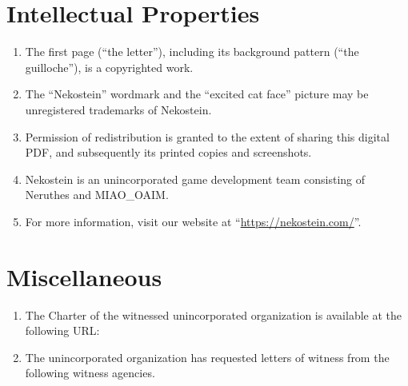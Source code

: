 \clearpage
\rmfamily\normalsize








\fakenewdoc
{}



\clearpage





\fakenewdoc
{}


\clearpage





\fakenewdoc
{}

\section{Intellectual Properties}
\begin{enumerate}
    \item The first page (``the letter''), including its background pattern (``the guilloche''), is a copyrighted work.
    \item The ``Nekostein'' wordmark and the ``excited cat face'' picture may be unregistered trademarks of Nekostein.
    \item Permission of redistribution is granted to the extent of sharing this digital PDF,
        and subsequently its printed copies and screenshots.
    \item Nekostein is an unincorporated game development team consisting of Neruthes and MIAO\_OAIM.
    \item For more information, visit our website at ``\href{https://nekostein.com/}{https://nekostein.com/}''.
\end{enumerate}

\section{Miscellaneous}
\begin{enumerate}
    \item The Charter of the witnessed unincorporated organization is available at the following URL:\\
        
    \item The unincorporated organization has requested letters of witness from the following witness agencies.
    \begin{itemize}
        
    \end{itemize}
\end{enumerate}









